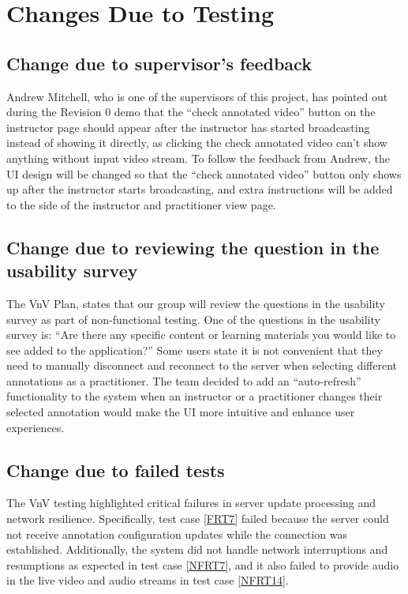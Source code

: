 \documentclass[12pt, titlepage]{article}
\begin{document}
\section{Changes Due to Testing}

\subsection{Change due to supervisor's feedback}

Andrew Mitchell, who is one of the supervisors of this project, has pointed out
during the Revision 0 demo that the “check annotated video” button on the
instructor page should appear after the instructor has started broadcasting
instead of showing it directly, as clicking the check annotated video can’t show
anything without input video stream. To follow the feedback from Andrew, the UI
design will be changed so that the “check annotated video” button only shows up
after the instructor starts broadcasting, and extra instructions will be added
to the side of the instructor and practitioner view page.

\subsection{Change due to reviewing the question in the usability survey}

The VnV Plan, states that our group will review the questions in the usability
survey as part of non-functional testing. One of the questions in the usability
survey is: “Are there any specific content or learning materials you would like
to see added to the application?” Some users state it is not convenient that
they need to manually disconnect and reconnect to the server when selecting
different annotations as a practitioner. The team decided to add an
“auto-refresh” functionality to the system when an instructor or a practitioner
changes their selected annotation would make the UI more intuitive and enhance
user experiences.

\subsection{Change due to failed tests}

The VnV testing highlighted critical failures in server update processing and
network resilience. Specifically, test case \ref{FRT7} failed because the server
could not receive annotation configuration updates while the connection was
established. Additionally, the system did not handle network interruptions and
resumptions as expected in test case \ref{NFRT7}, and it also failed to provide
audio in the live video and audio streams in test case \ref{NFRT14}.
\end{document}
